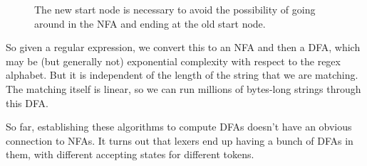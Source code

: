 \begin{algo}
\begin{enumerate}
\begin{figure}[H]
          \caption{ The new start node is necessary to avoid the possibility of going around in the NFA and ending at the old start node. }

          \label{fig:kleene_star}
        \end{figure}
        
    \end{enumerate}
  \end{algo}

  So given a regular expression, we convert this to an NFA and then a DFA, which may be (but generally not) exponential complexity with respect to the regex alphabet. But it is independent of the length of the string that we are matching. The matching itself is linear, so we can run millions of bytes-long strings through this DFA. 

  So far, establishing these algorithms to compute DFAs doesn't have an obvious connection to NFAs. It turns out that lexers end up having a bunch of DFAs in them, with different accepting states for different tokens. 

